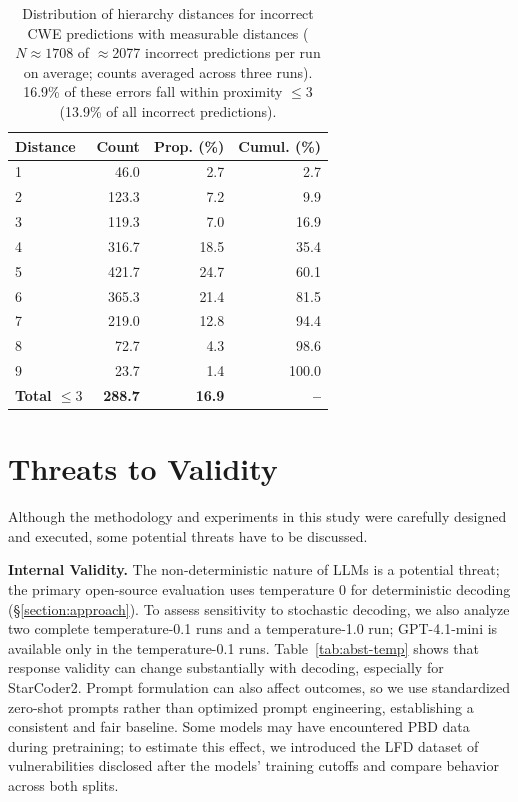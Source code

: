 \documentclass[lettersize,journal]{IEEEtran}
\begin{document}
\begin{table}[!t]
\centering%
\caption{Distribution of hierarchy distances for incorrect CWE predictions with
measurable distances ($N\approx1708$ of $\approx$2077 incorrect predictions per run on average; counts averaged across three runs).
16.9\% of these errors fall within proximity $\leq 3$ (13.9\% of all incorrect predictions).}
\label{tab:hierarchy_distance_dist}
\footnotesize
\renewcommand{\arraystretch}{1.0}
\setlength{\tabcolsep}{8pt}
\begin{tabular}{lrrr}
\toprule
\textbf{Distance} & \textbf{Count} & \textbf{Prop. (\%)} & \textbf{Cumul. (\%)} \\
\midrule
1 &  46.0 &  2.7 &  2.7 \\
2 & 123.3 &  7.2 &  9.9 \\
3 & 119.3 &  7.0 & 16.9 \\
4 & 316.7 & 18.5 & 35.4 \\
5 & 421.7 & 24.7 & 60.1 \\
6 & 365.3 & 21.4 & 81.5 \\
7 & 219.0 & 12.8 & 94.4 \\
8 &  72.7 &  4.3 & 98.6 \\
9 &  23.7 &  1.4 & 100.0 \\
\midrule
\textbf{Total $\leq 3$} & \textbf{288.7} & \textbf{16.9} & \textbf{--} \\
\bottomrule
\end{tabular}
\end{table}

\section{Threats to Validity}
\label{section:threatstovalidity}

Although the methodology and experiments in this study were carefully designed and executed, some potential threats have to be discussed.

\textbf{Internal Validity.}
The non-deterministic nature of \glspl{LLM} is a potential threat; the primary open-source evaluation uses temperature 0 for deterministic decoding (\S\ref{section:approach}). To assess sensitivity to stochastic decoding, we also analyze two complete temperature-0.1 runs and a temperature-1.0 run; GPT-4.1-mini is available only in the temperature-0.1 runs. Table~\ref{tab:abst-temp} shows that response validity can change substantially with decoding, especially for StarCoder2. Prompt formulation can also affect outcomes, so we use standardized zero-shot prompts rather than optimized prompt engineering, establishing a consistent and fair baseline. Some models may have encountered PBD data during pretraining; to estimate this effect, we introduced the LFD dataset of vulnerabilities disclosed after the models' training cutoffs and compare behavior across both splits.
\end{document}

